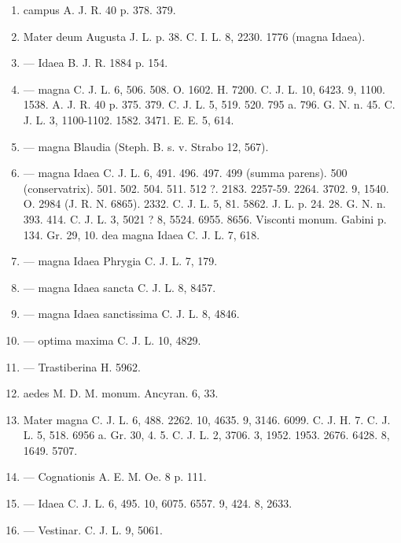 \documentclass[a4paper, 11pt, oneside, polutonikogreek, german, twocolumn]{article}
\begin{document}
\begin{enumerate}
\item campus A. J. R. 40 p. 378. 379.

\item Mater deum Augusta J. L. p. 38. C. I. L. 8, 2230. 1776 (magna Idaea).

\item --- Idaea B. J. R. 1884 p. 154.

\item --- magna C. J. L. 6, 506. 508. O. 1602. H. 7200. C. J. L. 10, 6423. 9, 1100. 1538. A. J. R. 40 p. 375. 379. C. J. L. 5, 519. 520. 795 a. 796. G. N. n. 45. C. J. L. 3, 1100-1102. 1582. 3471. E. E. 5, 614.

\item --- magna Blaudia (Steph. B. s. v. Strabo 12, 567).

\item --- magna Idaea C. J. L. 6, 491. 496. 497. 499 (summa parens). 500 (conservatrix). 501. 502. 504. 511. 512 ?. 2183. 2257-59. 2264. 3702. 9, 1540. O. 2984 (J. R. N. 6865). 2332. C. J. L. 5, 81. 5862. J. L. p. 24. 28. G. N. n. 393. 414. C. J. L. 3, 5021 ? 8, 5524. 6955. 8656. Visconti monum. Gabini p. 134. Gr. 29, 10. dea magna Idaea C. J. L. 7, 618.

\item --- magna Idaea Phrygia C. J. L. 7, 179.

\item --- magna Idaea sancta C. J. L. 8, 8457.

\item --- magna Idaea sanctissima C. J. L. 8, 4846.

\item --- optima maxima C. J. L. 10, 4829.

\item --- Trastiberina H. 5962.

\item aedes M. D. M. monum. Ancyran. 6, 33.

\item Mater magna C. J. L. 6, 488. 2262. 10, 4635. 9, 3146. 6099. C. J. H. 7. C. J. L. 5, 518. 6956 a. Gr. 30, 4. 5. C. J. L. 2, 3706. 3, 1952. 1953. 2676. 6428. 8, 1649. 5707.

\item --- Cognationis A. E. M. Oe. 8 p. 111.

\item --- Idaea C. J. L. 6, 495. 10, 6075. 6557. 9, 424. 8, 2633.

\item --- Vestinar. C. J. L. 9, 5061.


\end{enumerate}
\end{document}
